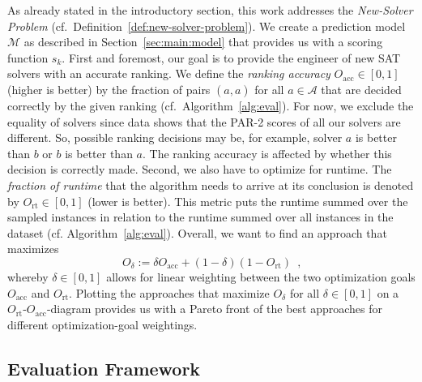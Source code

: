 \documentclass[runningheads]{llncs}
\begin{document}
As already stated in the introductory section, this work addresses the \emph{New-Solver Problem} (cf.~Definition~\ref{def:new-solver-problem}).
We create a prediction model $\mathcal{M}$ as described in Section~\ref{sec:main:model} that provides us with a scoring function $s_k$.
First and foremost, our goal is to provide the engineer of new SAT solvers with an accurate ranking.
We define the \emph{ranking accuracy} $O_{\operatorname{acc}} \in \left[0, 1\right]$ (higher is better) by the fraction of pairs $\left(\hat{a}, a\right)$ for all $a \in \mathcal{A}$ that are decided correctly by the given ranking (cf.~Algorithm~\ref{alg:eval}).
For now, we exclude the equality of solvers since data shows that the PAR-2 scores of all our solvers are different.
So, possible ranking decisions may be, for example, solver $a$ is better than $b$ or $b$ is better than $a$.
The ranking accuracy is affected by whether this decision is correctly made.
Second, we also have to optimize for runtime.
The \emph{fraction of runtime} that the algorithm needs to arrive at its conclusion is denoted by $O_{\operatorname{rt}} \in \left[0, 1\right]$ (lower is better).
This metric puts the runtime summed over the sampled instances in relation to the runtime summed over all instances in the dataset (cf. Algorithm~\ref{alg:eval}).
Overall, we want to find an approach that maximizes
%
\begin{equation}
  O_\delta := \delta O_{\operatorname{acc}} + \left(1 - \delta\right) \left(1 - O_{\operatorname{rt}}\right) \enspace \textrm{,}
  \label{eq:opt}
\end{equation} 
%
whereby $\delta \in \left[0, 1\right]$ allows for linear weighting between the two optimization goals $O_{\operatorname{acc}}$ and $O_{\operatorname{rt}}$.
Plotting the approaches that maximize $O_\delta$ for all $\delta \in \left[0, 1\right]$ on a $O_{\operatorname{rt}}$-$O_{\operatorname{acc}}$-diagram provides us with a Pareto front of the best approaches for different optimization-goal weightings.

\subsection{Evaluation Framework}
\label{sec:exdesign:evalframe}
\end{document}
